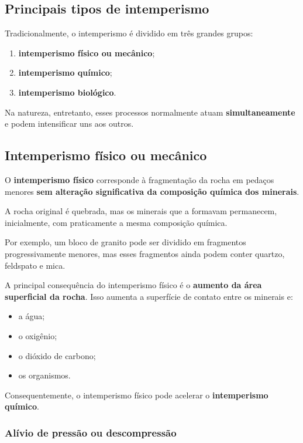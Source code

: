 \documentclass[a4paper,12pt]{article}
\theoremstyle{definition}
\theoremstyle{definition}
\theoremstyle{definition}
\begin{document}
\subsection{Principais tipos de intemperismo}

Tradicionalmente, o intemperismo é dividido em três grandes grupos:

\begin{enumerate}
    \item \textbf{intemperismo físico ou mecânico};
    \item \textbf{intemperismo químico};
    \item \textbf{intemperismo biológico}.
\end{enumerate}

Na natureza, entretanto, esses processos normalmente atuam \textbf{simultaneamente} e podem intensificar uns aos outros.

\subsection{Intemperismo físico ou mecânico}

O \textbf{intemperismo físico} corresponde à fragmentação da rocha em pedaços menores \textbf{sem alteração significativa da composição química dos minerais}.

A rocha original é quebrada, mas os minerais que a formavam permanecem, inicialmente, com praticamente a mesma composição química.

Por exemplo, um bloco de granito pode ser dividido em fragmentos progressivamente menores, mas esses fragmentos ainda podem conter quartzo, feldspato e mica.

A principal consequência do intemperismo físico é o \textbf{aumento da área superficial da rocha}. Isso aumenta a superfície de contato entre os minerais e:

\begin{itemize}
    \item a água;
    \item o oxigênio;
    \item o dióxido de carbono;
    \item os organismos.
\end{itemize}

Consequentemente, o intemperismo físico pode acelerar o \textbf{intemperismo químico}.

\subsubsection{Alívio de pressão ou descompressão}
\end{document}

